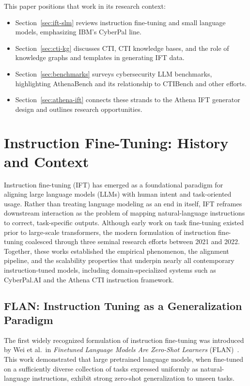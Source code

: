 \documentclass[10pt]{article}
\begin{document}
This paper positions that work in its research context:
\begin{itemize}[leftmargin=*]
  \item Section~\ref{sec:ift-slm} reviews instruction fine-tuning and small language models, emphasizing IBM’s CyberPal line.
  \item Section~\ref{sec:cti-kg} discusses CTI, CTI knowledge bases, and the role of knowledge graphs and templates in generating IFT data.
  \item Section~\ref{sec:benchmarks} surveys cybersecurity LLM benchmarks, highlighting AthenaBench and its relationship to CTIBench and other efforts.
  \item Section~\ref{sec:athena-ift} connects these strands to the Athena IFT generator design and outlines research opportunities.
\end{itemize}


\section{Instruction Fine-Tuning: History and Context}
\label{sec:ift-history}

Instruction fine-tuning (IFT) has emerged as a foundational paradigm for aligning large language models (LLMs) with human intent and task-oriented usage. Rather than treating language modeling as an end in itself, IFT reframes downstream interaction as the problem of mapping natural-language instructions to correct, task-specific outputs. Although early work on task fine-tuning existed prior to large-scale transformers, the modern formulation of instruction fine-tuning coalesced through three seminal research efforts between 2021 and 2022. Together, these works established the empirical phenomenon, the alignment pipeline, and the scalability properties that underpin nearly all contemporary instruction-tuned models, including domain-specialized systems such as CyberPal.AI and the Athena CTI instruction framework.

\subsection{FLAN: Instruction Tuning as a Generalization Paradigm}

The first widely recognized formulation of instruction fine-tuning was introduced by Wei et al.\ in \emph{Finetuned Language Models Are Zero-Shot Learners} (FLAN)~\cite{wei2022flan}. This work demonstrated that large pretrained language models, when fine-tuned on a sufficiently diverse collection of tasks expressed uniformly as natural-language instructions, exhibit strong zero-shot generalization to unseen tasks.
\end{document}
